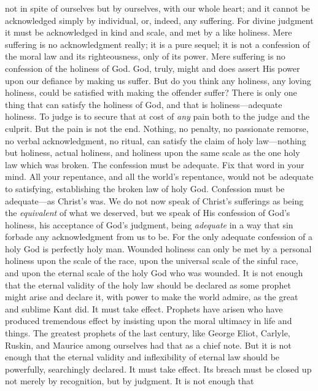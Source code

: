 \documentclass[draft]{ptfdoc}
\begin{document}
not in spite of ourselves but by 
ourselves, with our whole heart; and it cannot 
be acknowledged simply by individual, or, indeed, 
any suffering. For divine judgment it 
must be acknowledged in kind and scale, and 
met by a like holiness. Mere suffering is no 
acknowledgment really; it is a pure sequel; it 
is not a confession of the moral law and its 
righteousness, only of its power. Mere suffering 
is no confession of the holiness of God. God, 
truly, might and does assert His power upon 
our defiance by making us suffer. But do you 
think any holiness, any loving holiness, could 
be satisfied with making the offender suffer? 
There is only one thing that can satisfy the 
holiness of God, and that is holiness---adequate 
holiness. To judge is to secure that at cost of 
\textit{any} pain both to the judge and the culprit. But 
the pain is not the end. Nothing, no penalty, 
no passionate remorse, no verbal acknowledgment, 
no ritual, can satisfy the claim of holy 
law---nothing but holiness, actual holiness, and 
holiness upon the same scale as the one holy 
law which was broken. The confession must be 
adequate. Fix that word in your mind. All 
your repentance, and all the world's repentance, 
would not be adequate to satisfying, establishing 
the broken law of holy God. Confession 
must be adequate---as Christ's was. We do not 
now speak of Christ's sufferings as being the 
\textit{equivalent} of what we deserved, but we speak 
of His confession of God's holiness, his acceptance 
of God's judgment, being \textit{adequate} in a 
way that sin forbade any acknowledgment 
from us to be. For the only adequate confession 
of a holy God is perfectly holy man. 
Wounded holiness can only be met by a 
personal holiness upon the scale of the race, 
upon the universal scale of the sinful race, and 
upon the eternal scale of the holy God who was 
wounded. It is not enough that the eternal 
validity of the holy law should be declared as 
some prophet might arise and declare it, with 
power to make the world admire, as the great 
and sublime Kant did. It must take effect. 
Prophets have arisen who have produced 
tremendous effect by insisting upon the moral 
ultimacy in life and things. The greatest 
prophets of the last century, like George Eliot, 
Carlyle, Ruskin, and Maurice among ourselves 
had that as a chief note. But it is not 
enough that the eternal validity and inflexibility 
of eternal law should be powerfully, 
searchingly declared. It must take effect. Its 
breach must be closed up not merely by recognition, 
but by judgment. It is not enough that 
\end{document}
